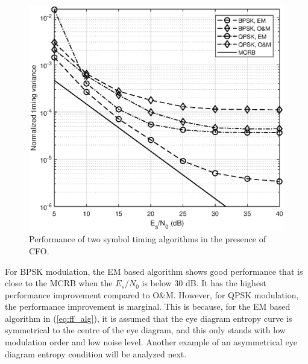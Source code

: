 \documentclass[journal,comsoc]{IEEEtran}
\begin{document}
\begin{figure}[ht]
\centering
\includegraphics[width=3 in]{pic/per_timing_frq-k.eps}
\caption{Performance of two symbol timing algorithms in the presence of CFO.}
\label{fig:timing_frq_per} 
\end{figure}  

For BPSK modulation, the EM based algorithm shows good performance that is close to the MCRB when the \(E_s/N_0\) is below 30 dB.
It has the highest performance improvement compared to O\&M.
However, for QPSK modulation, the performance improvement is marginal.
This is because, for the EM based algorithm in (\ref{eq:ff_alg}), it is assumed that the eye diagram entropy curve is symmetrical to the centre of the eye diagram, and this only stands with low modulation order and low noise level.
Another example of an asymmetrical eye diagram entropy condition will be analyzed next. 
\end{document}
